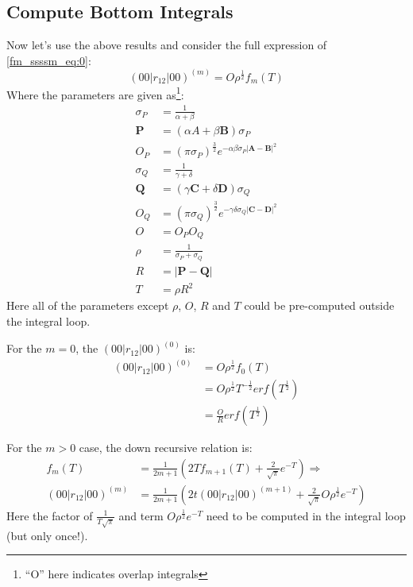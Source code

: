 \subsection{Compute Bottom Integrals}
%
%
Now let's use the above results and consider the full expression of 
\ref{fm_ssssm_eq:0}:
\begin{equation}
 (00|r_{12}|00)^{(m)} = O\rho^{\frac{1}{2}}f_{m}(T)
\label{fm_ssssm_eq:1}
\end{equation}
Where the parameters are given as\footnote{``O'' here indicates 
overlap integrals}:
\begin{equation}
 \begin{split}
  \sigma_{P} &= \frac{1}{\alpha + \beta} \\
  \bm{P}  &=(\alpha{A} + \beta\bm{B})\sigma_{P} \\
  O_{P} &= (\pi\sigma_{P})^{\frac{3}{2}}e^{-\alpha\beta\sigma_{P}
  |\bm{A}-\bm{B}|^{2}} \\
   \sigma_{Q} &= \frac{1}{\gamma + \delta} \\
  \bm{Q}  &= (\gamma\bm{C} + \delta\bm{D})\sigma_{Q} \\
  O_{Q} &= (\pi\sigma_{Q})^{\frac{3}{2}}e^{-\gamma\delta\sigma_{Q}
  |\bm{C}-\bm{D}|^{2}} \\
  O &= O_{P}O_{Q} \\
  \rho &= \frac{1}{\sigma_{P} + \sigma_{Q}} \\
  R &= |\bm{P}-\bm{Q}| \\
  T &= \rho R^{2}
 \end{split}
 \label{fm_ssssm_eq:2}
\end{equation}
Here all of the parameters except $\rho$, $O$, $R$ and $T$ could be 
pre-computed outside the integral loop.

For the $m=0$, the $(00|r_{12}|00)^{(0)}$ is:
\begin{equation}
 \begin{split}
  (00|r_{12}|00)^{(0)} &= O\rho^{\frac{1}{2}}f_{0}(T) \\
  &= O\rho^{\frac{1}{2}} T^{-\frac{1}{2}} erf(T^{\frac{1}{2}}) \\
  &= \frac{O}{R}erf(T^{\frac{1}{2}}) 
 \end{split}
 \label{fm_ssssm_eq:3}
\end{equation}

For the $m>0$ case, the down recursive relation is:
\begin{equation}
\begin{split}
 f_{m}(T) &=\frac{1}{2m+1}\left( 2Tf_{m+1}(T) + \frac{2}{\sqrt{\pi}}e^{-T}\right)
 \Rightarrow \\
 (00|r_{12}|00)^{(m)} &= \frac{1}{2m+1}
 \left( 2t(00|r_{12}|00)^{(m+1)} + \frac{2}{\sqrt{\pi}}O\rho^{\frac{1}{2}}e^{-T} \right)
\end{split}
\label{fm_ssssm_eq:4}
\end{equation}
Here the factor of $\frac{1}{T\sqrt{\pi}}$ and term 
$O\rho^{\frac{1}{2}}e^{-T}$ need to 
be computed in the integral loop (but only once!). 

